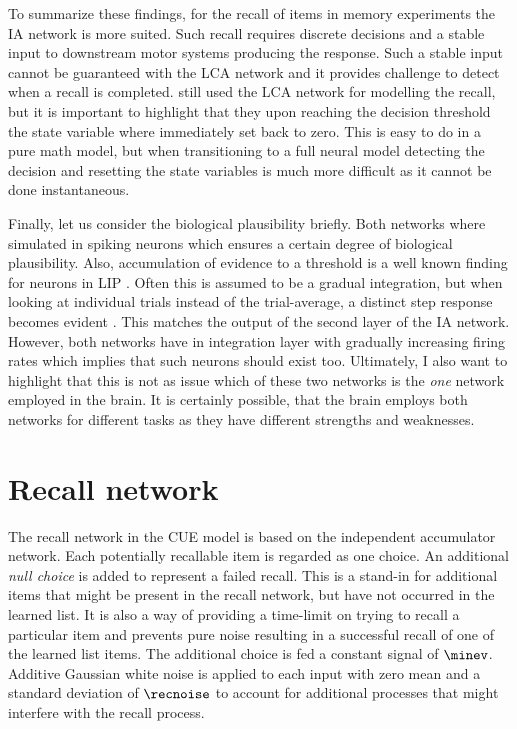 To summarize these findings, for the recall of items in memory experiments the IA network is more suited.
Such recall requires discrete decisions and a stable input to downstream motor systems producing the response.
Such a stable input cannot be guaranteed with the LCA network and it provides challenge to detect when a recall is completed.
\Textcite{Sederberg2008} still used the LCA network for modelling the recall, but it is important to highlight that they upon reaching the decision threshold the state variable where immediately set back to zero.
This is easy to do in a pure math model, but when transitioning to a full neural model detecting the decision and resetting the state variables is much more difficult as it cannot be done instantaneous.

Finally, let us consider the biological plausibility briefly.
Both networks where simulated in spiking neurons which ensures a certain degree of biological plausibility.
Also, accumulation of evidence to a threshold is a well known finding for neurons in LIP \parencite{gold2007,smith2004}.
Often this is assumed to be a gradual integration, but when looking at individual trials instead of the trial-average, a distinct step response becomes evident \parencite{latimer2015}.
This matches the output of the second layer of the IA network.
However, both networks have in integration layer with gradually increasing firing rates which implies that such neurons should exist too.
Ultimately, I also want to highlight that this is not as issue which of these two networks is the \emph{one} network employed in the brain.
It is certainly possible, that the brain employs both networks for different tasks as they have different strengths and weaknesses.


\section{Recall network}\label{sec:recall-net}
The recall network in the CUE model is based on the independent accumulator network.
Each potentially recallable item is regarded as one choice.
An additional \emph{null choice} is added to represent a failed recall.
This is a stand-in for additional items that might be present in the recall network, but have not occurred in the learned list.
It is also a way of providing a time-limit on trying to recall a particular item and prevents pure noise resulting in a successful recall of one of the learned list items.
The additional choice is fed a constant signal of $\minev$.
Additive Gaussian white noise is applied to each input with zero mean and a standard deviation of $\recnoise$ to account for additional processes that might interfere with the recall process.

